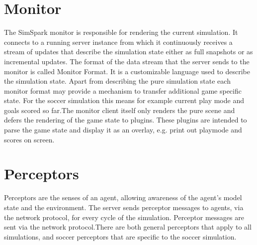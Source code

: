 \section{Monitor}
The SimSpark monitor is responsible for rendering the current simulation. It connects to a running server instance from which it continuously receives a stream of updates that describe the simulation state either as full snapshots or as incremental updates.
The format of the data stream that the server sends to the monitor is called Monitor Format. It is a customizable language used to describe the simulation state.
Apart from describing the pure simulation state each monitor format may provide a mechanism to transfer additional game specific state. For the soccer simulation this means for example current play mode and goals scored so far.The monitor client itself only renders the pure scene and defers the rendering of the game state to plugins. These plugins are intended to parse the game state and display it as an overlay, e.g. print out playmode and scores on screen.
\section{Perceptors}
Perceptors are the senses of an agent, allowing awareness of the agent's model state and the environment.
The server sends perceptor messages to agents, via the network protocol, for every cycle of the simulation.
Perceptor messages are sent via the network protocol.There are both general perceptors that apply to all simulations, and soccer perceptors that are specific to the soccer simulation.
